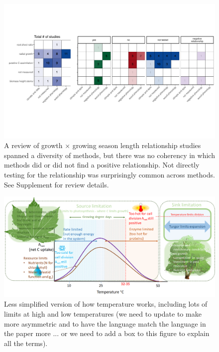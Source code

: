 \documentclass[11pt]{article}
\begin{document}
\clearpage
\begin{figure}[h!]
\includegraphics[width=1\textwidth]{..//figures/heatmaps/combinedheatmap_gslxgrowth_simple.pdf}
\caption{A review of growth $\times$ growing season length relationship studies spanned a diversity of methods, but there was no coherency in which methods did or did not find a positive relationship. Not directly testing for the relationship was surprisingly common across methods. See Supplement for review details.}
\label{fig:heatmaps}
\end{figure}

\clearpage
\begin{figure}[h!]
\includegraphics[width=1\textwidth]{..//figures/grephonfig.png}
\caption{Less simplified version of how temperature works, including lots of limits at high and low temperatures (we need to update to make more asymmetric and to have the language match the language in the paper more ... or we need to add a box to this figure to explain all the terms).}
\label{fig:temperaturecomplex}
\end{figure}
\end{document}
